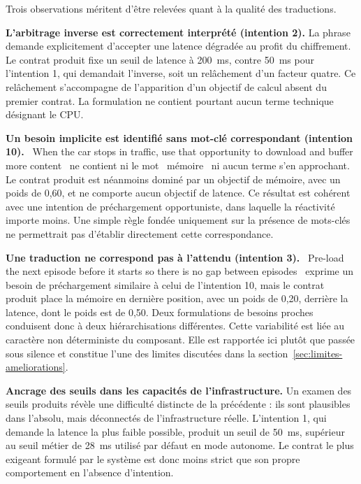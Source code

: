 Trois observations méritent d'être relevées quant à la qualité des traductions.

\textbf{L'arbitrage inverse est correctement interprété (intention 2).} La phrase demande explicitement d'accepter une latence dégradée au profit du chiffrement. Le contrat produit fixe un seuil de latence à 200~ms, contre 50~ms pour l'intention 1, qui demandait l'inverse, soit un relâchement d'un facteur quatre. Ce relâchement s'accompagne de l'apparition d'un objectif de calcul absent du premier contrat. La formulation ne contient pourtant aucun terme technique désignant le CPU.

\textbf{Un besoin implicite est identifié sans mot-clé correspondant (intention 10).} \og~When the car stops in traffic, use that opportunity to download and buffer more content~\fg{} ne contient ni le mot \og~mémoire~\fg{} ni aucun terme s'en approchant. Le contrat produit est néanmoins dominé par un objectif de mémoire, avec un poids de 0,60, et ne comporte aucun objectif de latence. Ce résultat est cohérent avec une intention de préchargement opportuniste, dans laquelle la réactivité importe moins. Une simple règle fondée uniquement sur la présence de mots-clés ne permettrait pas d'établir directement cette correspondance.

\textbf{Une traduction ne correspond pas à l'attendu (intention 3).} \og~Pre-load the next episode before it starts so there is no gap between episodes~\fg{} exprime un besoin de préchargement similaire à celui de l'intention 10, mais le contrat produit place la mémoire en dernière position, avec un poids de 0,20, derrière la latence, dont le poids est de 0,50. Deux formulations de besoins proches conduisent donc à deux hiérarchisations différentes. Cette variabilité est liée au caractère non déterministe du composant. Elle est rapportée ici plutôt que passée sous silence et constitue l'une des limites discutées dans la section~\ref{sec:limites-ameliorations}.

\textbf{Ancrage des seuils dans les capacités de l'infrastructure.} Un examen des seuils produits révèle une difficulté distincte de la précédente : ils sont plausibles dans l'absolu, mais déconnectés de l'infrastructure réelle. L'intention 1, qui demande la latence la plus faible possible, produit un seuil de 50~ms, supérieur au seuil métier de 28~ms utilisé par défaut en mode autonome. Le contrat le plus exigeant formulé par le système est donc moins strict que son propre comportement en l'absence d'intention.

